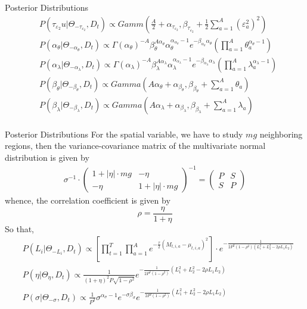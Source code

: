 \documentclass[10pt]{beamer} %
\begin{document}
\begin{frame}{Posterior Distributions}
    \begin{align*}
        &P(\tau_{\varepsilon_2}u|\Theta_{-\tau_{\varepsilon_2}},D_{t})\propto Gamm\left(\frac{A}{2}+\alpha_{\tau_{\varepsilon_2}},\beta_{\tau_{\varepsilon_2}}+\frac{1}{2}\sum_{a=1}^{A}(\varepsilon_a^2)^2 \right)\\
        &P(\alpha_\theta|\Theta_{-\alpha_\theta},D_{t})\propto \Gamma(\alpha_{\theta})^{-A}\beta_{\theta}^{A\alpha_{\theta}}\alpha_{\theta}^{\alpha_{\alpha_{\theta}}-1}e^{-\beta_{\alpha_{\theta}}\alpha_{\theta}}\left(\prod_{a=1}^{A}\theta_{a}^{\alpha_{\theta}-1}\right)\\
        &P(\alpha_\lambda|\Theta_{-\alpha_\lambda},D_{t})\propto \Gamma(\alpha_{\lambda})^{-A}\beta_{\lambda}^{A\alpha_{\lambda}}\alpha_{\lambda}^{\alpha_{\alpha_{\lambda}}-1}e^{-\beta_{\alpha_{\lambda}}\alpha_{\lambda}}\left(\prod_{a=1}^{A}\lambda_{a}^{\alpha_{\lambda}-1}\right)\\
        &P(\beta_{\theta}|\Theta_{-\beta_{\theta}},D_{t})\propto Gamma\left(A\alpha_{\theta}+\alpha_{\beta_{\theta}},\beta_{\beta_{\theta}}+\sum_{a=1}^{A}\theta_{a} \right)\\
        &P(\beta_{\lambda}|\Theta_{-\beta_{\lambda}},D_{t})\propto Gamma\left(A\alpha_{\lambda}+\alpha_{\beta_{\lambda}},\beta_{\beta_{\lambda}}+\sum_{a=1}^{A}\lambda_{a} \right)\\
    \end{align*}
\end{frame}
\begin{frame}{Posterior Distributions}
For the spatial variable, we have to study $ mg $ neighboring regions, then the variance-covariance matrix of the multivariate normal distribution is given by
\begin{align*}
	\sigma^{-1}\cdot\left( \begin{array}{cc}
	1+|\eta|\cdot mg & -\eta \\
	-\eta & 1+|\eta|\cdot mg
	\end{array} \right)^{-1} =\left( \begin{array}{cc}
	P&S\\
	S&P
	\end{array}\right)
\end{align*}
whence, the correlation coefficient is given by 
$$\rho =\frac{\eta}{1+\eta}$$
So that,
\begin{align*}
&P(L_i|\Theta_{-L_i},D_{t})\propto\left[\prod_{t=1}^{T}\prod_{a=1}^{A}e^{-\frac{\tau}{2}(M_{t,i,a}-\mu_{t,i,a})^2}\right]\cdot e^{-\frac{1}{2P^2(1-\rho^2)\left(L_1^2+L_2^2-2\rho L_1L_2\right)}}\\
    &P(\eta|\Theta_{\eta},D_{t})\propto \frac{1}{(1+\eta)^2P\sqrt{1-\rho^2}}e^{-\frac{1}{2P^2(1-\rho^2)}(L_1^2+L_2^2-2\rho L_1L_2)}\\
    &P(\sigma|\Theta_{-\sigma},D_{t})\propto \frac{1}{P^2}\sigma^{\alpha_\sigma-1}e^{-\sigma \beta_\sigma}e^{-\frac{1}{2P^2(1-\rho^2)}(L_1^2+L_2^2-2\rho L_1L_2)}
\end{align*}

\end{frame}
\end{document}
